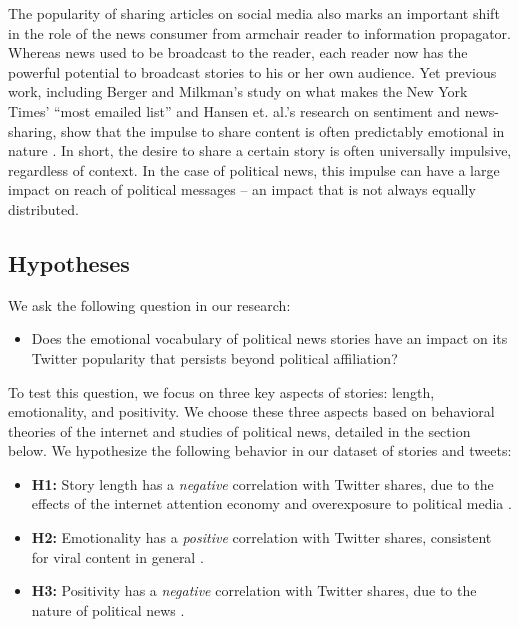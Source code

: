 \documentclass[letterpaper]{article}
\begin{document}
  
The popularity of sharing articles on social media also marks an important shift in the role of the news consumer from armchair reader to information propagator. Whereas news used to be broadcast to the reader, each reader now has the powerful potential to broadcast stories to his or her own audience. Yet previous work, including Berger and Milkman's study on what makes the New York Times' ``most emailed list'' and Hansen et. al.'s research on sentiment and news-sharing, show that the impulse to share content is often predictably emotional in nature \cite{berger2012makes, hansen2011good}. In short, the desire to share a certain story is often universally impulsive, regardless of context. In the case of political news, this impulse can have a large impact on reach of political messages -- an impact that is not always equally distributed. 

 \subsection{Hypotheses}
We ask the following question in our research: 

\begin{itemize}
\item Does the emotional vocabulary of political news stories have an impact on its Twitter popularity that persists beyond political affiliation?  
\end{itemize}

To test this question, we focus on three key aspects of stories: length, emotionality, and positivity. We choose these three aspects based on behavioral theories of the internet and studies of political news, detailed in the section below. We hypothesize the following behavior in our dataset of stories and tweets:

\begin{itemize} 
    \item \textbf{H1:} Story length has a \emph{negative} correlation with Twitter shares, due to the effects of the internet attention economy and overexposure to political media \cite{goldhaber1997attention}.
    \item \textbf{H2:} Emotionality has a \emph{positive} correlation with Twitter shares, consistent for viral content in general \cite{berger2012makes}.
    \item \textbf{H3:} Positivity has a \emph{negative} correlation with Twitter shares, due to the nature of political news \cite{berger2012makes, hansen2011good}.

\end{itemize}
\end{document}
